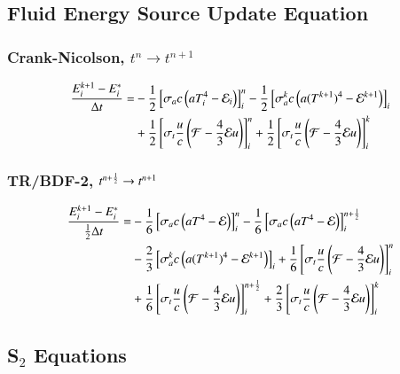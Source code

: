 \documentclass[preprint,12pt]{elsarticle}
\begin{document}
\subsection{Fluid Energy Source Update Equation}
\subsubsection{Crank-Nicolson, $t^n\rightarrow t^{n+1}$}
\begin{equation}\begin{split}
  \frac{E_i^{k+1}-E_i^*}{\dt} = &
  -\half\left[\sigma_{a} c\left(aT_i^4 - \E_i\right)\right]_i^n
  -\half\left[\sigma_{a}^k c\left(a(T^{k+1})^4 - \E^{k+1}\right)\right]_i\\
  &+\half\left[\sigma_{t}\frac{u}{c}\left(\F-\frac{4}{3}\E u\right)\right]_i^n
   +\half\left[\sigma_{t}\frac{u}{c}\left(\F-\frac{4}{3}\E u\right)\right]_i^k
\lequ{hydroECNfull}
\end{split}\end{equation}

\subsubsection{TR/BDF-2, $t^{n+\frac{1}{2}}\rightarrow t^{n+1}$}
\begin{equation}\begin{split}
  \frac{E_i^{k+1}-E_i^*}{\half\dt} = &
  -\sixth\left[\sigma_a c\left(aT^4 - \E\right)\right]_i^n
  -\sixth\left[\sigma_a c\left(aT^4 - \E\right)\right]_i^{n+\half}\\
  &-\frac{2}{3}\left[\sigma_a^k c\left(a(T^{k+1})^4 - \E^{k+1}\right)\right]_i
   +\sixth\left[\sigma_t\frac{u}{c}\left(\F-\frac{4}{3}\E u\right)\right]_i^n\\
  &+\sixth\left[\sigma_t\frac{u}{c}\left(\F-\frac{4}{3}\E u\right)\right]_i^{n+\half}
   +\frac{2}{3}\left[\sigma_t\frac{u}{c}\left(\F-\frac{4}{3}\E u\right)\right]_i^k
\lequ{hydroEBDF2full}
\end{split}\end{equation}

\subsection{S$_2$ Equations}
\end{document}
